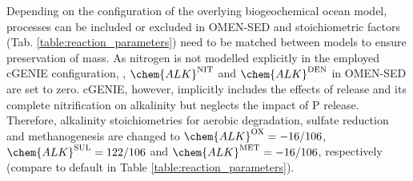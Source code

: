 \documentclass[gmd, manuscript]{copernicus}
\begin{document}

Depending on the configuration of the overlying biogeochemical ocean model, processes can be included or excluded in OMEN-SED and stoichiometric factors (Tab. \ref{table:reaction_parameters}) need to be matched between models 
to ensure preservation of mass. As nitrogen is not modelled explicitly in the employed cGENIE configuration, , $\chem{ALK}^\mathrm{NIT}$ and $\chem{ALK}^\mathrm{DEN}$ in OMEN-SED are set to zero. 
cGENIE, however, implicitly includes the effects of  release and its complete nitrification on alkalinity but neglects the impact of P release. Therefore, alkalinity 
stoichiometries for aerobic degradation, sulfate reduction and methanogenesis are changed to $\chem{ALK}^\mathrm{OX} = -16/106$, $\chem{ALK}^\mathrm{SUL} = 122/106$ and $\chem{ALK}^\mathrm{MET} = -16/106$, respectively 
(compare to default in Table \ref{table:reaction_parameters}).
\end{document}
